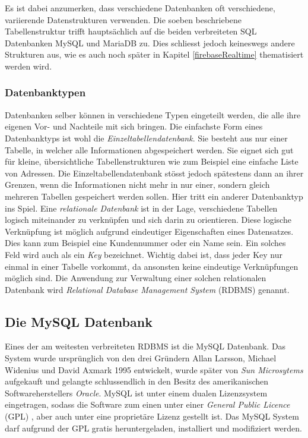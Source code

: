 \documentclass[../main.tex]{subfiles}
\begin{document}
	Es ist dabei anzumerken, dass verschiedene Datenbanken oft verschiedene, variierende Datenstrukturen verwenden. Die soeben beschriebene Tabellenstruktur trifft hauptsächlich auf die beiden verbreiteten SQL Datenbanken MySQL und MariaDB zu. Dies schliesst jedoch keineswegs andere Strukturen aus, wie es auch noch später in Kapitel \ref{firebaseRealtime} thematisiert werden wird.
	
	\subsubsection*{Datenbanktypen}
	Datenbanken selber können in verschiedene Typen eingeteilt werden, die alle ihre eigenen Vor- und Nachteile mit sich bringen. Die einfachste Form eines Datenbanktyps ist wohl die \emph{Einzeltabellendatenbank}. Sie besteht aus nur einer Tabelle, in welcher alle Informationen abgespeichert werden. Sie eignet sich gut für kleine, übersichtliche Tabellenstrukturen wie zum Beispiel eine einfache Liste von Adressen. Die Einzeltabellendatenbank stösst jedoch spätestens dann an ihrer Grenzen, wenn die Informationen nicht mehr in nur einer, sondern gleich mehreren Tabellen gespeichert werden sollen. Hier tritt ein anderer Datenbanktyp ins Spiel. Eine \emph{relationale Datenbank} ist in der Lage, verschiedene Tabellen logisch miteinander zu verknüpfen und sich darin zu orientieren. Diese logische Verknüpfung ist möglich aufgrund eindeutiger Eigenschaften eines Datensatzes. Dies kann zum Beispiel eine Kundennummer oder ein Name sein. Ein solches Feld wird auch als ein \emph{Key} bezeichnet. Wichtig dabei ist, dass jeder Key nur einmal in einer Tabelle vorkommt, da ansonsten keine eindeutige Verknüpfungen möglich sind. Die Anwendung zur Verwaltung einer solchen relationalen Datenbank wird \emph{Relational Database Management System} (RDBMS) genannt. \cite[S. 745 - 751]{IT-Handbuch}
	
	\subsection{Die MySQL Datenbank}
	Eines der am weitesten verbreiteten RDBMS ist die MySQL Datenbank. Das System wurde ursprünglich von den drei Gründern Allan Larsson, Michael Widenius und David Axmark 1995 entwickelt, wurde später von \emph{Sun Microsytems} aufgekauft und gelangte schlussendlich in den Besitz des amerikanischen Softwareherstellers \emph{Oracle}. MySQL ist unter einem dualen Lizenzsystem eingetragen, sodass die Software zum einen unter einer \emph{General Public Licence} (GPL) \cite{GPL}, aber auch unter eine proprietäre Lizenz \cite{proprietaereLizenz} gestellt ist. \cite{tecmint.com} Das MySQL System darf aufgrund der GPL gratis heruntergeladen, installiert und modifiziert werden.
	
\end{document}
